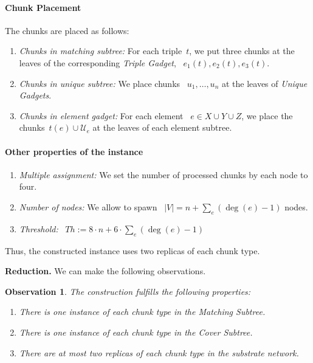 \documentclass[preprint,12pt]{elsarticle}
\newcommand{\numNodes}{\ensuremath{|V|}}
\newcommand{\MatchSubtree}{{\emph{Matching Subtree}}}
\newcommand{\CoverSubtree}{{\emph{Cover Subtree}}}
\newcommand{\TripleGadget}{{\emph{Triple Gadget}}}
\newcommand{\UnqGadgets}{{\emph{Unique Gadgets}}}
\newcommand{\UniqueE}{{\ensuremath{\mathcal{U}_e}}}
\newtheorem{obs}{Observation}
\newcommand{\Thr}{\ensuremath{Th}}
\begin{document}
\paragraph{Chunk Placement}
The chunks are placed as follows:
\begin{enumerate}
  \item \emph{Chunks in matching subtree:} For each triple~$t$, we put
  three chunks at the leaves of the corresponding \TripleGadget,
 ~$e_1(t), e_2(t), e_3(t)$.
  \item \emph{Chunks in unique subtree:} We place chunks
 ~$u_1,\ldots, u_n$ at the leaves of \UnqGadgets.
  \item \emph{Chunks in element gadget:} For each element
 ~$e\in X\cup Y\cup Z$, we place the chunks~$t(e)\cup \UniqueE$ at the
  leaves of each element subtree.
\end{enumerate}

\paragraph{Other properties of the instance}
\begin{enumerate}
  \item \emph{Multiple assignment:} We set the number of processed
  chunks by each node to four.
  \item \emph{Number of nodes:} We allow to spawn
 ~$\numNodes = n + \sum_{e}(\deg(e)-1)$ nodes.
  \item \emph{Threshold:}
 ~$\Thr := 8\cdot n + 6\cdot\sum_{e}(\deg(e)-1)$
\end{enumerate}

Thus, the constructed instance uses two replicas of each chunk type.

\textbf{Reduction.}  We can make the following observations.

\begin{obs}
  The construction fulfills the following properties:
  \begin{enumerate}
    \item There is one instance of each chunk type in the
    \MatchSubtree.

    \item There is one instance of each chunk type in the
    \CoverSubtree.

    \item There are at most two replicas of each chunk type in the
    substrate network.
  \end{enumerate}
\end{obs}
\end{document}
